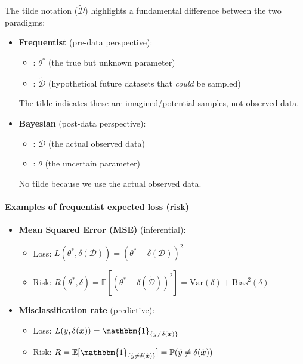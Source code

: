 The tilde notation ($\tilde{\mathcal{D}}$) highlights a fundamental difference between
the two paradigms:
\begin{itemize}
    \item \textbf{Frequentist} (pre-data perspective):
        \begin{itemize}
            \item {}: $\theta^{*}$ (the true but unknown parameter)
            \item {}: $\tilde{\mathcal{D}}$ (hypothetical future datasets
                that \emph{could} be sampled)
        \end{itemize}
        The tilde indicates these are imagined/potential samples, not observed data.
    \item \textbf{Bayesian} (post-data perspective):
        \begin{itemize}
            \item {}: $\mathcal{D}$ (the actual observed data)
            \item {}: $\theta$ (the uncertain parameter)
        \end{itemize}
        No tilde because we use the actual observed data.
\end{itemize}

\paragraph{Examples of frequentist expected loss (risk)}
\begin{itemize}
    \item \textbf{Mean Squared Error (MSE)} (inferential):
        \begin{itemize}
            \item Loss: $L(\theta^*, \delta(\mathcal{D})) = (\theta^* - \delta(\mathcal{D}))^2$
            \item Risk: $R(\theta^*, \delta) = \mathbb{E}[(\theta^* - \delta(\tilde{\mathcal{D}}))^2]
                = \text{Var}(\delta) + \text{Bias}^2(\delta)$
        \end{itemize}
    \item \textbf{Misclassification rate} (predictive):
        \begin{itemize}
            \item Loss: $L(y, \delta(\bm{x})) = \mathbbm{1}_{\{y \neq \delta(\bm{x})\}}$
            \item Risk: $R = \mathbb{E}[\mathbbm{1}_{\{\tilde{y} \neq \delta(\tilde{\bm{x}})\}}]
                = \mathbb{P}(\tilde{y} \neq \delta(\tilde{\bm{x}}))$
        \end{itemize}
\end{itemize}

